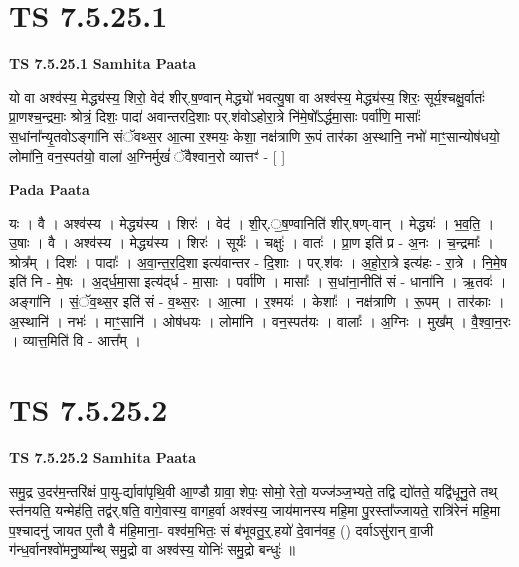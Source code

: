 \documentclass[17pt]{extarticle}
\begin{document}
\section*{ TS 7.5.25.1 }

\textbf{TS 7.5.25.1 } \newline
\textbf{Samhita Paata} \newline

यो वा अश्व॑स्य॒ मेद्ध्य॑स्य॒ शिरो॒ वेद॑ शीर्.ष॒ण्वान् मेद्ध्यो॑ भवत्यु॒षा वा अश्व॑स्य॒ मेद्ध्य॑स्य॒ शिरः॒ सूर्य॒श्चक्षु॒र्वातः॑ प्रा॒णश्च॒न्द्रमाः॒ श्रोत्रं॒ दिशः॒ पादा॑ अवान्तरदि॒शाः पर्.श॑वोऽहोरा॒त्रे नि॑मे॒षो᳚ऽर्द्धमा॒साः पर्वा॑णि॒ मासाः᳚ स॒धांना᳚न्यृ॒तवोऽङ्गा॑नि संॅवथ्स॒र आ॒त्मा र॒श्मयः॒ केशा॒ नक्ष॑त्राणि रू॒पं तार॑का अ॒स्थानि॒ नभो॑ माꣳ॒॒सान्योष॑धयो॒ लोमा॑नि॒ वन॒स्पत॑यो॒ वाला॑ अ॒ग्निर्मुखं॑ ॅवैश्वान॒रो व्यात्तꣳ॑ - [  ] \newline

\textbf{Pada Paata} \newline

यः । वै । अश्व॑स्य । मेद्ध्य॑स्य । शिरः॑ । वेद॑ । शी॒र्.॒ष॒ण्वानिति॑ शीर्.षण्-वान् । मेद्ध्यः॑ । भ॒व॒ति॒ । उ॒षाः । वै । अश्व॑स्य । मेद्ध्य॑स्य । शिरः॑ । सूर्यः॑ । चक्षुः॑ । वातः॑ । प्रा॒ण इति॑ प्र - अ॒नः । च॒न्द्रमाः᳚ । श्रोत्र᳚म् । दिशः॑ । पादाः᳚ । अ॒वा॒न्त॒र॒दि॒शा इत्य॑वान्तर - दि॒शाः । पर्.श॑वः । अ॒हो॒रा॒त्रे इत्य॑हः - रा॒त्रे । नि॒मे॒ष इति॑ नि - मे॒षः । अ॒द्‌र्ध॒मा॒सा इत्य॑द्‌र्ध - मा॒साः । पर्वा॑णि । मासाः᳚ । स॒धांना॒नीति॑ सं - धाना॑नि । ऋ॒तवः॑ । अङ्गा॑नि । सं॒ॅव॒थ्स॒र इति॑ सं - व॒थ्स॒रः । आ॒त्मा । र॒श्मयः॑ । केशाः᳚ । नक्ष॑त्राणि । रू॒पम् । तार॑काः । अ॒स्थानि॑ । नभः॑ । माꣳ॒॒सानि॑ । ओष॑धयः । लोमा॑नि । वन॒स्पत॑यः । वालाः᳚ । अ॒ग्निः । मुख᳚म् । वै॒श्वा॒न॒रः । व्यात्त॒मिति॑ वि - आत्त᳚म् ।  \newline




\section*{ TS 7.5.25.2 }

\textbf{TS 7.5.25.2 } \newline
\textbf{Samhita Paata} \newline

समु॒द्र उ॒दर॑म॒न्तरि॑क्षं पा॒यु-र्द्यावा॑पृथि॒वी आ॒ण्डौ ग्रावा॒ शेपः॒ सोमो॒ रेतो॒ यज्ज॑ञ्ज॒भ्यते॒ तद्वि द्यो॑तते॒ यद्वि॑धूनु॒ते तथ् स्त॑नयति॒ यन्मेह॑ति॒ तद्व॑र्.षति॒ वागे॒वास्य॒ वागह॒र्वा अश्व॑स्य॒ जाय॑मानस्य महि॒मा पु॒रस्ता᳚ज्जायते॒ रात्रि॑रेनं महि॒मा प॒श्चादनु॑ जायत ए॒तौ वै म॑हि॒माना॒- वश्व॑म॒भितः॒ सं ब॑भूवतु॒र्॒.हयो॑ दे॒वान॑वह॒ () दर्वाऽसु॑रान् वा॒जी ग॑न्ध॒र्वानश्वो॑मनु॒ष्या᳚न्थ् समु॒द्रो वा अश्व॑स्य॒ योनिः॑ समु॒द्रो बन्धुः॑ ॥ \newline
\end{document}
